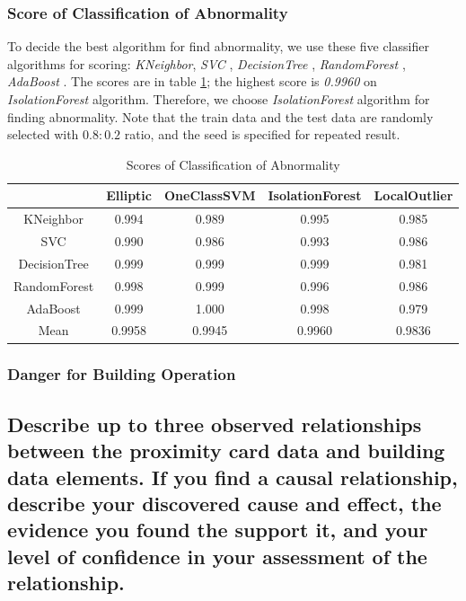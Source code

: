 \documentclass[aps, 10pt, a4paper]{article}
\begin{document}
            \subsubsection{Score of Classification of Abnormality}
                To decide the best algorithm for find abnormality, we use these five classifier algorithms for scoring: \textit{KNeighbor}, \textit{SVC} \cite{ref:svc1, ref:svc2}, \textit{DecisionTree} \cite{ref:decisiontree1, ref:decisiontree2, ref:decisiontree3}, \textit{RandomForest} \cite{ref:decisiontree3}, \textit{AdaBoost} \cite{ref:ada1, ref:ada2}. The scores are in table \ref{tb:abnormal}; the highest score is \textit{0.9960} on \textit{IsolationForest} algorithm. Therefore, we choose \textit{IsolationForest} algorithm for finding abnormality. Note that the train data and the test data are randomly selected with \( 0.8 : 0.2\) ratio, and the seed is specified for repeated result. 
                
                \begin{table}[htbp]
                    \centering
                    \caption{Scores of Classification of Abnormality}
                    \label{tb:abnormal}
                    \begin{tabular}{c|cccc}
                        & Elliptic & OneClassSVM & IsolationForest & LocalOutlier \\ \hline
                        KNeighbor & 0.994 & 0.989 & 0.995 & 0.985 \\
                        SVC & 0.990 & 0.986 & 0.993 & 0.986 \\
                        DecisionTree & 0.999 & 0.999 & 0.999 & 0.981 \\
                        RandomForest & 0.998 & 0.999 & 0.996 & 0.986 \\
                        AdaBoost & 0.999 & 1.000 & 0.998 & 0.979 \\ \hline
                        Mean & 0.9958 & 0.9945 & 0.9960 & 0.9836 \\
                    \end{tabular}
                \end{table}
            
            \subsubsection{Danger for Building Operation}
        
        \subsection[Question 4]{Describe up to three observed relationships between the proximity card data and building data elements. If you find a causal relationship, describe your discovered cause and effect, the evidence you found the support it, and your level of confidence in your assessment of the relationship.}
            \label{sec:question4}
\end{document}
